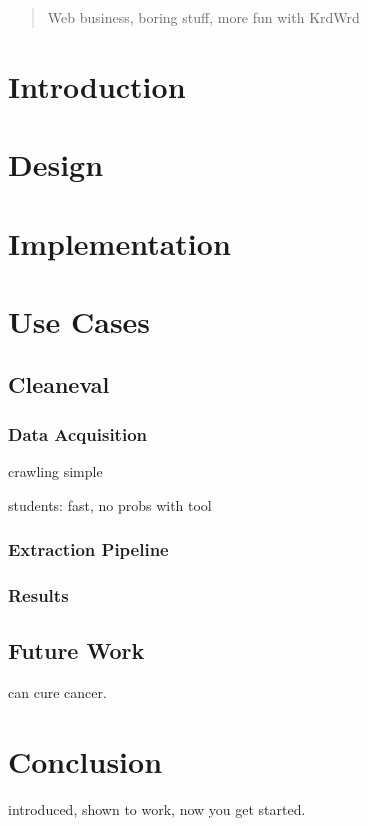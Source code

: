 \begin{abstract}
Web business, boring stuff, more fun with KrdWrd
\end{abstract}

\section{Introduction}


\section{Design}


\section{Implementation}


\section{Use Cases}

\subsection{Cleaneval}
\subsubsection{Data Acquisition}
crawling simple

students: fast, no probs with tool

\subsubsection{Extraction Pipeline}

\subsubsection{Results}

\subsection{Future Work}
can cure cancer.

\section{Conclusion}
introduced, shown to work, now you get started.


